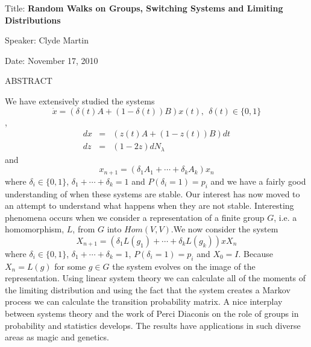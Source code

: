 \documentclass{amsart}
\theoremstyle{definition}
\theoremstyle{remark}
\numberwithin{equation}{section}
\begin{document}
 \noindent Title: {\bf Random Walks on Groups,  Switching Systems and Limiting
 Distributions}\medskip

\noindent Speaker: Clyde Martin\medskip

\noindent Date: November 17, 2010
\bigskip

\centerline{ ABSTRACT}

We have extensively studied the systems
 $$\dot{x}=(\delta(t)A+(1-\delta(t))B)x(t),\ \
 \delta(t)\in\{0,1\}$$,
 \begin{eqnarray*}dx&=&(z(t)A+(1-z(t))B)dt\\dz&=&(1-2z)dN_\lambda\end{eqnarray*}
 and $$x_{n+1}=(\delta_1A_1+\cdots+\delta_kA_k)x_n$$ where
 $\delta_i\in\{0,1\}$, $\delta_1+\cdots+\delta_k=1$ and $P(\delta_i=1)=p_i$ and we have
 a fairly good understanding of when these systems are stable. Our
 interest has now moved to an attempt to understand what happens
 when they are not stable. Interesting phenomena occurs when we
 consider a representation of a finite group $G$, i.e. a homomorphism, $L$, from $G$ into
 $Hom(V,V)$.We now consider the system $$X_{n+1}=(\delta_1L(g_1)+\cdots+\delta_kL(g_k))xX_n$$ where
 $\delta_i\in\{0,1\}$, $\delta_1+\cdots+\delta_k=1$,
 $P(\delta_i=1)=p_i$ and $X_0=I$.  Because $X_n=L(g)$ for some
 $g\in G$ the system evolves on the image of the representation.
 Using linear system theory we can calculate all of the moments
 of the limiting distribution and using the fact that the system
 creates a Markov process we can calculate the transition
 probability matrix. A nice interplay between systems theory and
 the work of Perci Diaconis on the role of groups in probability
 and statistics develops. The results  have applications in such
 diverse areas as magic and genetics.








 
\end{document}
